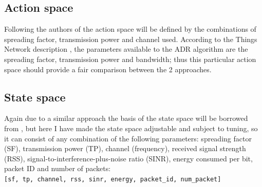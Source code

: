 \subsection{Action space}

Following the authors of \cite{rl_lora_original} the action
space will be defined by the combinations of spreading factor,
transmission power and channel used. According to the Things Network description \cite{ttn_adr}, the 
parameters available to the ADR algorithm are the spreading 
factor, transmission power and bandwidth; thus this particular
action space should provide a fair comparison between the 2
approaches. 

\subsection{State space}

Again due to a similar approach the basis of the state space will
be borrowed from \cite{rl_lora_original}, but here I have made
the state space adjustable and subject to tuning, so it can 
consist of any combination of the following parameters: spreading
factor (SF),  transmission power (TP), channel (frequency),
received signal strength (RSS), signal-to-interference-plus-noise
ratio (SINR), energy consumed per bit, packet ID and number of
packets: \\ 

\texttt{[sf, tp, channel, rss, sinr, energy, packet\_id, num\_packet]}





